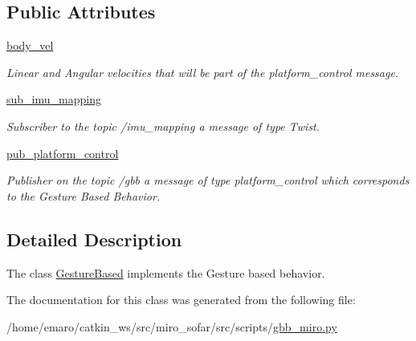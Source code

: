 \subsection*{Public Attributes}
\begin{DoxyCompactItemize}
\item 
\mbox{\label{classgbb__miro_1_1GestureBased_a843b6c194d6a1eaf1ebd1b64a9640029}} 
\mbox{\hyperlink{classgbb__miro_1_1GestureBased_a843b6c194d6a1eaf1ebd1b64a9640029}{body\+\_\+vel}}
\begin{DoxyCompactList}\small\item\em Linear and Angular velocities that will be part of the platform\+\_\+control message. \end{DoxyCompactList}\item 
\mbox{\label{classgbb__miro_1_1GestureBased_a7dcbe92c3a3f519aadb2100611307a4b}} 
\mbox{\hyperlink{classgbb__miro_1_1GestureBased_a7dcbe92c3a3f519aadb2100611307a4b}{sub\+\_\+imu\+\_\+mapping}}
\begin{DoxyCompactList}\small\item\em Subscriber to the topic /imu\+\_\+mapping a message of type Twist. \end{DoxyCompactList}\item 
\mbox{\label{classgbb__miro_1_1GestureBased_a55c8badeade411056ded86b61cc10062}} 
\mbox{\hyperlink{classgbb__miro_1_1GestureBased_a55c8badeade411056ded86b61cc10062}{pub\+\_\+platform\+\_\+control}}
\begin{DoxyCompactList}\small\item\em Publisher on the topic /gbb a message of type platform\+\_\+control which corresponds to the Gesture Based Behavior. \end{DoxyCompactList}\end{DoxyCompactItemize}


\subsection{Detailed Description}
The class \mbox{\hyperlink{classgbb__miro_1_1GestureBased}{Gesture\+Based}} implements the Gesture based behavior. 

The documentation for this class was generated from the following file\+:\begin{DoxyCompactItemize}
\item 
/home/emaro/catkin\+\_\+ws/src/miro\+\_\+sofar/src/scripts/\mbox{\hyperlink{gbb__miro_8py}{gbb\+\_\+miro.\+py}}\end{DoxyCompactItemize}
